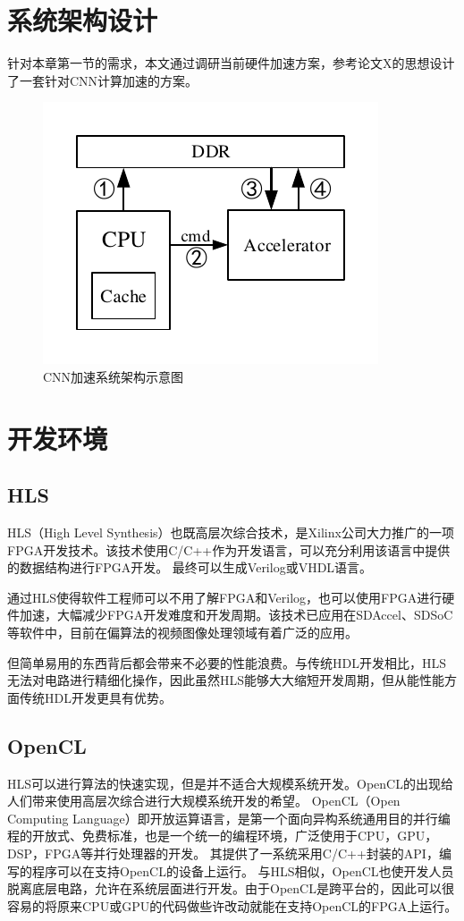 \section{系统架构设计}
    针对本章第一节的需求，本文通过调研当前硬件加速方案，参考论文X的思想设计了一套针对CNN计算加速的方案。
    \begin{figure}[h]
        \centering
        \includegraphics{../pdf/system.pdf}
        \caption{CNN加速系统架构示意图}
        \label{}
    \end{figure}

\section{开发环境}
    \subsection{HLS}
    HLS（High Level Synthesis）也既高层次综合技术，是Xilinx公司大力推广的一项FPGA开发技术。该技术使用C/C++作为开发语言，可以充分利用该语言中提供的数据结构进行FPGA开发。
    最终可以生成Verilog或VHDL语言。

    通过HLS使得软件工程师可以不用了解FPGA和Verilog，也可以使用FPGA进行硬件加速，大幅减少FPGA开发难度和开发周期。该技术已应用在SDAccel、SDSoC等软件中，目前在偏算法的视频图像处理领域有着广泛的应用。

    但简单易用的东西背后都会带来不必要的性能浪费。与传统HDL开发相比，HLS无法对电路进行精细化操作，因此虽然HLS能够大大缩短开发周期，但从能性能方面传统HDL开发更具有优势。
    \subsection{OpenCL}
    HLS可以进行算法的快速实现，但是并不适合大规模系统开发。OpenCL的出现给人们带来使用高层次综合进行大规模系统开发的希望。
    OpenCL（Open Computing Language）即开放运算语言，是第一个面向异构系统通用目的并行编程的开放式、免费标准，也是一个统一的编程环境，广泛使用于CPU，GPU，DSP，FPGA等并行处理器的开发。
    其提供了一系统采用C/C++封装的API，编写的程序可以在支持OpenCL的设备上运行。
    与HLS相似，OpenCL也使开发人员脱离底层电路，允许在系统层面进行开发。由于OpenCL是跨平台的，因此可以很容易的将原来CPU或GPU的代码做些许改动就能在支持OpenCL的FPGA上运行。
